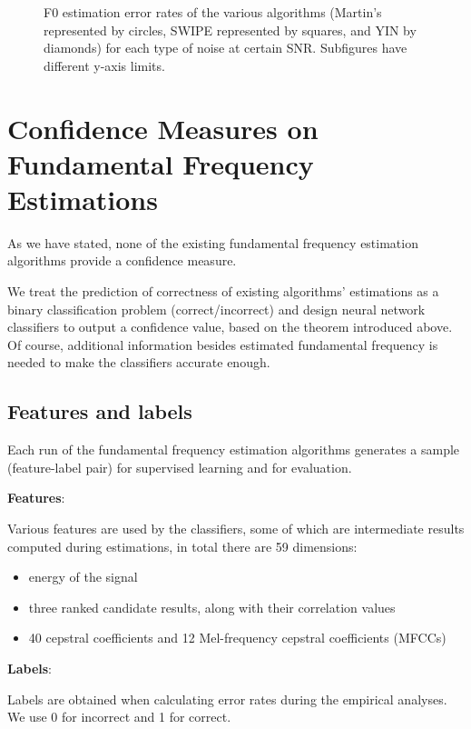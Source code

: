 \documentclass[11pt,a4paper]{report}
\begin{document}
\begin{figure}[htbp]
  \caption[F0 estimation error rates of the various algorithms for each type of noise at certain SNR.]{F0 estimation error rates of the various algorithms (Martin's represented by circles, SWIPE represented by squares, and YIN by diamonds) for each type of noise at certain SNR\@.
    Subfigures have different y-axis limits.}
  \label{fig:random-noise-snr-same-audio}
\end{figure}

\chapter{Confidence Measures on Fundamental Frequency Estimations}

As we have stated, none of the existing fundamental frequency estimation algorithms provide a confidence measure.

We treat the prediction of correctness of existing algorithms' estimations as a binary classification problem (correct/incorrect) and design neural network classifiers to output a confidence value, based on the theorem introduced above.
Of course, additional information besides estimated fundamental frequency is needed to make the classifiers accurate enough.

\newpage

\section{Features and labels}

Each run of the fundamental frequency estimation algorithms generates a sample (feature-label pair) for supervised learning and for evaluation.

\begin{mdframed}
\noindent \textbf{Features}:

Various features are used by the classifiers, some of which are intermediate results computed during estimations, in total there are 59 dimensions:

\begin{itemize}
  \item energy of the signal
  \item three ranked candidate results, along with their correlation values
  \item 40 cepstral coefficients and 12 Mel-frequency cepstral coefficients (MFCCs) \parencite{mermelstein1976distance,davis1980comparison}
\end{itemize}

\noindent \textbf{Labels}:

Labels are obtained when calculating error rates during the empirical analyses.
We use 0 for incorrect and 1 for correct.
\end{mdframed}
\end{document}
